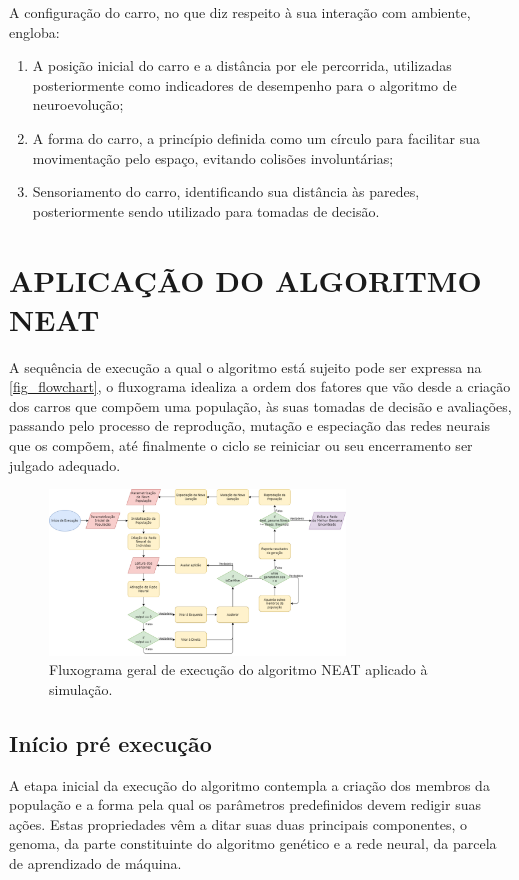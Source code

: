 A configuração do carro, no que diz respeito à sua interação
com ambiente, engloba:

\begin{enumerate}
	\item A posição inicial do carro e a distância por ele percorrida, utilizadas posteriormente como indicadores de desempenho para o algoritmo de neuroevolução;
	\item A forma do carro, a princípio definida como um círculo para facilitar sua movimentação pelo espaço, evitando colisões involuntárias;
	\item Sensoriamento do carro, identificando sua distância às paredes, posteriormente sendo utilizado para tomadas de decisão.
\end{enumerate}


\section{APLICA{\c C}{\~A}O DO ALGORITMO NEAT}
A sequência de execução a qual o algoritmo está sujeito pode ser expressa na \autoref{fig_flowchart}, o fluxograma idealiza a ordem dos fatores que vão desde a criação dos carros que compõem uma população, às suas tomadas de decisão e avaliações, passando pelo processo de reprodução, mutação e especiação das redes neurais que os compõem, até finalmente o ciclo se reiniciar ou seu encerramento ser julgado adequado.

\begin{figure}[htb]
        \centering
        \caption{\label{fig_flowchart}Fluxograma geral de execução do algoritmo NEAT aplicado à simulação.}
        \includegraphics[width=0.7\textwidth]{images/flowchart.png}
\end{figure}

\subsection{Início pré execução}
A etapa inicial da execução do algoritmo contempla a criação dos membros da população
e a forma pela qual os parâmetros predefinidos devem redigir suas ações. Estas propriedades
vêm a ditar suas duas principais componentes, o genoma, da parte constituinte do algoritmo
genético e a rede neural, da parcela de aprendizado de máquina.

